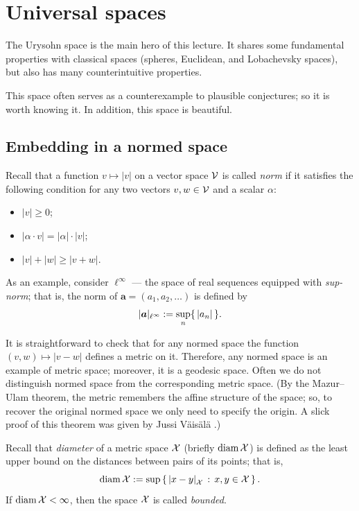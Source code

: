 \chapter{Universal spaces}\label{chap:urysohn}

The Urysohn space is the main hero of this lecture.
It shares some fundamental properties with classical spaces (spheres, Euclidean, and Lobachevsky spaces),
but also has many counterintuitive properties.

This space often serves as a counterexample to plausible conjectures;
so it is worth knowing it.
In addition, this space is beautiful.



\section{Embedding in a normed space}

Recall that a function $v\mapsto |v|$ on a vector space $\mathcal{V}$ is called \emph{norm} if it satisfies the following condition for any two vectors $v,w\in \mathcal{V}$ and a scalar $\alpha$:
\begin{itemize}
\item $|v|\ge 0$;
\item $|\alpha\cdot v|=|\alpha|\cdot |v|$;
\item $|v|+|w|\ge|v+w|$.
\end{itemize}

As an example, consider \index{$\ell^\infty$}$\ell^\infty$ --- the space of real sequences equipped with \emph{sup-norm}; that is, the norm of $\bm{a}=(a_1,a_2,\dots)$ is defined by
\[|\bm{a}|_{\ell^\infty}
\mathrel{:=}
\sup_n\{\,|a_n|\,\}.\]


It is straightforward to check that for any normed space the function $(v,w)\mapsto |v-w|$ defines a metric on it.
Therefore, any normed space is an example of metric space;
moreover, it is a geodesic space.
Often we do not distinguish normed space from the corresponding metric space.
(By the Mazur--Ulam theorem, the metric remembers the affine structure of the space; so, to recover the original normed space we only need to specify the origin.
A slick proof of this theorem was given by Jussi V\"{a}is\"{a}l\"{a} \cite{vaisala}.)

Recall that \emph{diameter} of a metric space $\mathcal{X}$ (briefly $\operatorname{\rm diam}\nolimits \mathcal{X}$) is defined as the least upper bound on the distances between pairs of its points;
that is,
\[\diam \spc{X}
\df
\sup\set{\dist{x}{y}{\spc{X}}}{x,y\in \spc{X}}.\]
If $\operatorname{\rm diam}\nolimits\mathcal{X}<\infty$, then the space $\mathcal{X}$ is called \emph{bounded}.



